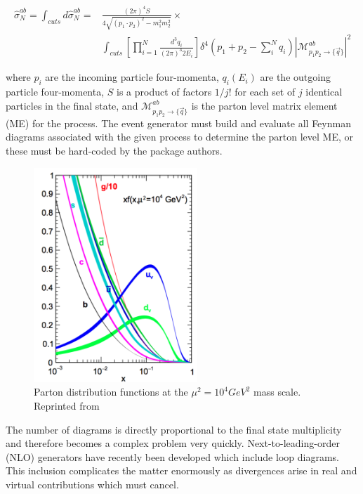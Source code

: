 \begin{equation}
\begin{split}\label{eq:event_generation_partonic_cross_section}
\hat{\sigma}_{N}^{ab}=\int_{cuts}d\hat{\sigma}_{N}^{ab}={}&\frac{\left(2\pi\right)^{4}S}{4\sqrt{\left(p_{1}{\cdot}p_{2}\right)^{2}-m_{1}^{2}m_{2}^{2}}}\times \\ &\int_{cuts} \left[\prod_{i=1}^{N}\frac{d^{3}q_{i}}{\left(2\pi\right)^{3}2E_{i}}\right]\delta^{4}\left(p_{1}+p_{2}-\sum_{i}^{N}q_{i}\right)|\mathcal{M}_{p_{1}p_{2}\rightarrow\{\vec{q}\}}^{ab}|^{2}
\end{split}
\end{equation}

where $p_{i}$ are the incoming particle four-momenta, $q_{i}(E_{i})$ are the outgoing particle four-momenta, $S$ is a product of factors $1/j!$ for each set of $j$ identical particles in the final state, and $\mathcal{M}_{p_{1}p_{2}\rightarrow\{\vec{q}\}}^{ab}$ is the parton level matrix element (ME) for the process. The event generator must build and evaluate all Feynman diagrams associated with the given process to determine the parton level ME, or these must be hard-coded by the package authors. 

\begin{figure}[h]
  	\label{fig:pdfs}
 	\centering
 	\includegraphics[width=0.55\textwidth]{figures/pdfs.png}
 	\singlespace
 	\caption{Parton distribution functions at the $\mu^{2}=10^{4}GeV^{2}$ mass scale. Reprinted from \cite{Martin:2009iq}}
 \end{figure}

The number of diagrams is directly proportional to the final state multiplicity and therefore becomes a complex problem very quickly. Next-to-leading-order (NLO) generators have recently been developed which include loop diagrams. This inclusion complicates the matter enormously as divergences arise in real and virtual contributions which must cancel. 

